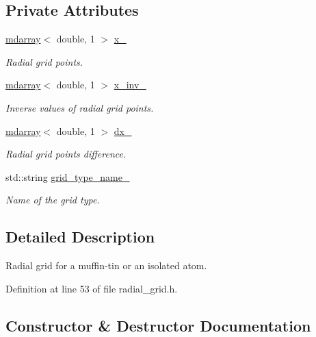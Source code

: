 \subsection*{Private Attributes}
\begin{DoxyCompactItemize}
\item 
\hyperlink{classsddk_1_1mdarray}{mdarray}$<$ double, 1 $>$ \hyperlink{classsirius_1_1_radial__grid_a32a5426b40eb245b874fad4c94a2a854}{x\+\_\+}
\begin{DoxyCompactList}\small\item\em Radial grid points. \end{DoxyCompactList}\item 
\hyperlink{classsddk_1_1mdarray}{mdarray}$<$ double, 1 $>$ \hyperlink{classsirius_1_1_radial__grid_a0d2bf26a23dc0c96e3f5bf9a49e7f464}{x\+\_\+inv\+\_\+}
\begin{DoxyCompactList}\small\item\em Inverse values of radial grid points. \end{DoxyCompactList}\item 
\hyperlink{classsddk_1_1mdarray}{mdarray}$<$ double, 1 $>$ \hyperlink{classsirius_1_1_radial__grid_a45e025061de272a37ffcc756fe4bec19}{dx\+\_\+}
\begin{DoxyCompactList}\small\item\em Radial grid points difference. \end{DoxyCompactList}\item 
std\+::string \hyperlink{classsirius_1_1_radial__grid_a6a43795fd734611edaf54f02299c9784}{grid\+\_\+type\+\_\+name\+\_\+}
\begin{DoxyCompactList}\small\item\em Name of the grid type. \end{DoxyCompactList}\end{DoxyCompactItemize}


\subsection{Detailed Description}
Radial grid for a muffin-\/tin or an isolated atom. 

Definition at line 53 of file radial\+\_\+grid.\+h.



\subsection{Constructor \& Destructor Documentation}
\hypertarget{classsirius_1_1_radial__grid_ab8a33615324e5cc8b2426dbff0b07949}{}

